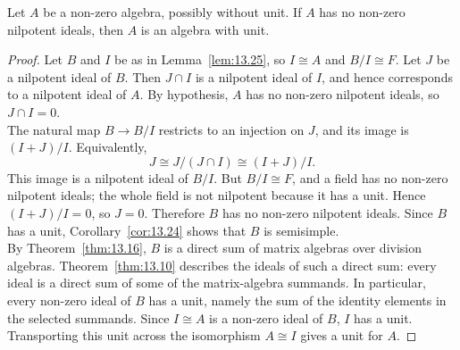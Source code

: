 \documentclass[../Odyssey_Project.tex]{subfiles}
\begin{document}
\begin{theorem}
\label{thm:13.26}
Let $A$ be a non-zero algebra, possibly without unit. If $A$ has no non-zero nilpotent ideals, then $A$ is an algebra with unit.
\end{theorem}
\begin{proof}
    Let $B$ and $I$ be as in Lemma~\ref{lem:13.25}, so $I \cong A$ and $B/I \cong F$. Let $J$ be a nilpotent ideal of $B$. Then $J \cap I$ is a nilpotent ideal of $I$, and hence corresponds to a nilpotent ideal of $A$. By hypothesis, $A$ has no non-zero nilpotent ideals, so $J \cap I=0$.\\
    The natural map $B \to B/I$ restricts to an injection on $J$, and its image is $(I+J)/I$. Equivalently,
    \[
        J \cong J/(J\cap I) \cong (I+J)/I.
    \]
    This image is a nilpotent ideal of $B/I$. But $B/I \cong F$, and a field has no non-zero nilpotent ideals; the whole field is not nilpotent because it has a unit. Hence $(I+J)/I=0$, so $J=0$. Therefore $B$ has no non-zero nilpotent ideals. Since $B$ has a unit, Corollary~\ref{cor:13.24} shows that $B$ is semisimple.\\
    By Theorem~\ref{thm:13.16}, $B$ is a direct sum of matrix algebras over division algebras. Theorem~\ref{thm:13.10} describes the ideals of such a direct sum: every ideal is a direct sum of some of the matrix-algebra summands. In particular, every non-zero ideal of $B$ has a unit, namely the sum of the identity elements in the selected summands. Since $I \cong A$ is a non-zero ideal of $B$, $I$ has a unit. Transporting this unit across the isomorphism $A \cong I$ gives a unit for $A$.
\end{proof}
\end{document}
